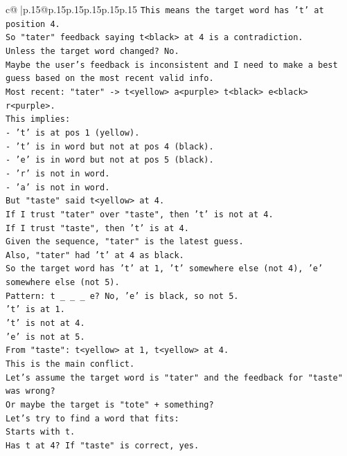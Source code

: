 \documentclass{article}
\begin{document}
{\begin{supertabular}{c@{$\;$}|p{.15\linewidth}@{}p{.15\linewidth}p{.15\linewidth}p{.15\linewidth}p{.15\linewidth}p{.15\linewidth}}
{{{\texttt{This means the target word has 't' at position 4.} \\
\texttt{So "tater" feedback saying t<black> at 4 is a contradiction.} \\
\texttt{Unless the target word changed? No.} \\
\texttt{Maybe the user's feedback is inconsistent and I need to make a best guess based on the most recent valid info.} \\
\texttt{Most recent: "tater" {-}> t<yellow> a<purple> t<black> e<black> r<purple>.} \\
\texttt{This implies:} \\
\texttt{{-} 't' is at pos 1 (yellow).} \\
\texttt{{-} 't' is in word but not at pos 4 (black).} \\
\texttt{{-} 'e' is in word but not at pos 5 (black).} \\
\texttt{{-} 'r' is not in word.} \\
\texttt{{-} 'a' is not in word.} \\
\texttt{But "taste" said t<yellow> at 4.} \\
\texttt{If I trust "tater" over "taste", then 't' is not at 4.} \\
\texttt{If I trust "taste", then 't' is at 4.} \\
\texttt{Given the sequence, "tater" is the latest guess.} \\
\texttt{Also, "tater" had 't' at 4 as black.} \\
\texttt{So the target word has 't' at 1, 't' somewhere else (not 4), 'e' somewhere else (not 5).} \\
\texttt{Pattern: t \_ \_ \_ e? No, 'e' is black, so not 5.} \\
\texttt{'t' is at 1.} \\
\texttt{'t' is not at 4.} \\
\texttt{'e' is not at 5.} \\
\texttt{From "taste": t<yellow> at 1, t<yellow> at 4.} \\
\texttt{This is the main conflict.} \\
\texttt{Let's assume the target word is "tater" and the feedback for "taste" was wrong?} \\
\texttt{Or maybe the target is "tote" + something?} \\
\texttt{Let's try to find a word that fits:} \\
\texttt{Starts with t.} \\
\texttt{Has t at 4? If "taste" is correct, yes.} \\
}}}
\end{supertabular}}
\end{document}
